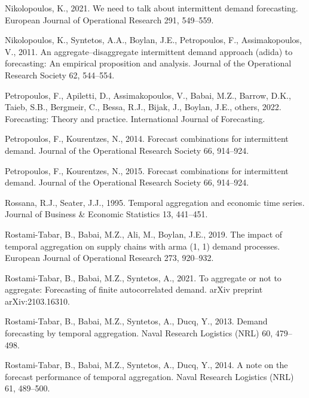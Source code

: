 \documentclass[]{elsarticle} %
\begin{document}
\leavevmode\hypertarget{ref-nikolopoulos2021we}{}%
Nikolopoulos, K., 2021. We need to talk about intermittent demand
forecasting. European Journal of Operational Research 291, 549--559.

\leavevmode\hypertarget{ref-nikolopoulos2011aggregate}{}%
Nikolopoulos, K., Syntetos, A.A., Boylan, J.E., Petropoulos, F.,
Assimakopoulos, V., 2011. An aggregate--disaggregate intermittent demand
approach (adida) to forecasting: An empirical proposition and analysis.
Journal of the Operational Research Society 62, 544--554.

\leavevmode\hypertarget{ref-petropoulos2022forecasting}{}%
Petropoulos, F., Apiletti, D., Assimakopoulos, V., Babai, M.Z., Barrow,
D.K., Taieb, S.B., Bergmeir, C., Bessa, R.J., Bijak, J., Boylan, J.E.,
others, 2022. Forecasting: Theory and practice. International Journal of
Forecasting.

\leavevmode\hypertarget{ref-petropoulos2014forecast}{}%
Petropoulos, F., Kourentzes, N., 2014. Forecast combinations for
intermittent demand. Journal of the Operational Research Society 66,
914--924.

\leavevmode\hypertarget{ref-petropoulos2015forecast}{}%
Petropoulos, F., Kourentzes, N., 2015. Forecast combinations for
intermittent demand. Journal of the Operational Research Society 66,
914--924.

\leavevmode\hypertarget{ref-rossana1995temporal}{}%
Rossana, R.J., Seater, J.J., 1995. Temporal aggregation and economic
time series. Journal of Business \& Economic Statistics 13, 441--451.

\leavevmode\hypertarget{ref-rostami2019impact}{}%
Rostami-Tabar, B., Babai, M.Z., Ali, M., Boylan, J.E., 2019. The impact
of temporal aggregation on supply chains with arma (1, 1) demand
processes. European Journal of Operational Research 273, 920--932.

\leavevmode\hypertarget{ref-rostami2021aggregate}{}%
Rostami-Tabar, B., Babai, M.Z., Syntetos, A., 2021. To aggregate or not
to aggregate: Forecasting of finite autocorrelated demand. arXiv
preprint arXiv:2103.16310.

\leavevmode\hypertarget{ref-rostami2013demand}{}%
Rostami-Tabar, B., Babai, M.Z., Syntetos, A., Ducq, Y., 2013. Demand
forecasting by temporal aggregation. Naval Research Logistics (NRL) 60,
479--498.

\leavevmode\hypertarget{ref-rostami2014note}{}%
Rostami-Tabar, B., Babai, M.Z., Syntetos, A., Ducq, Y., 2014. A note on
the forecast performance of temporal aggregation. Naval Research
Logistics (NRL) 61, 489--500.
\end{document}
